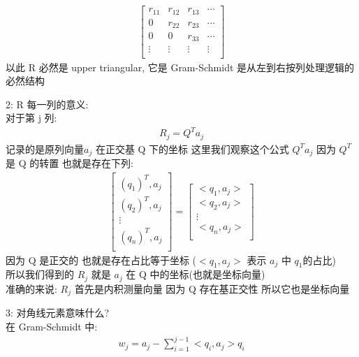 \documentclass[12pt]{article}
\begin{document}
\begin{flushleft}
\begin{align}
        \begin{bmatrix}
            r_{11} & r_{12} & r_{13} & \cdots \\
            0      & r_{22} & r_{23} & \cdots \\
            0      & 0      & r_{33} & \cdots \\
            \vdots & \vdots & \vdots & \vdots \\
        \end{bmatrix}
    \end{align}
    以此 R 必然是 upper triangular, 它是  Gram-Schmidt 是从左到右按列处理逻辑的必然结构

    2: R 每一列的意义: \\
    对于第 j 列: \\
    \begin{align}
        R_{j} = Q^{T}a_{j}
    \end{align}
    记录的是原列向量$a_{j}$ 在正交基 Q 下的坐标
    这里我们观察这个公式 $Q^{T}a_{j}$  因为 $Q^{T}$ 是 Q 的转置
    也就是存在下列: \\
    \begin{align}
        \begin{bmatrix}
            (q_{1})^{T},a_{j} \\
            (q_{2})^{T},a_{j} \\
            \vdots            \\
            (q_{n})^{T},a_{j} \\
        \end{bmatrix}
        =  \begin{bmatrix}
               <q_{1},a_{j}> \\
               <q_{2},a_{j}> \\
               \vdots        \\
               <q_{n},a_{j}> \\
           \end{bmatrix}
    \end{align}
    因为 Q 是正交的 也就是存在占比等于坐标 ($<q_{1},a_{j}>$ 表示 $a_{j}$ 中 $q_{1}$的占比) \\
    所以我们得到的 $R_{j}$ 就是 $a_{j}$ 在 Q 中的坐标(也就是坐标向量) \\
    准确的来说: $R_{j}$ 首先是内积测量向量 因为 Q 存在基正交性 所以它也是坐标向量

    3: 对角线元素意味什么? \\
    在 Gram-Schmidt 中: \\
    \begin{align}
        w_{j} = a_{j} - \sum_{i = 1}^{j - 1}<q_{i},a_{j}>q_{i}
    \end{align}


\end{flushleft}
\end{document}
